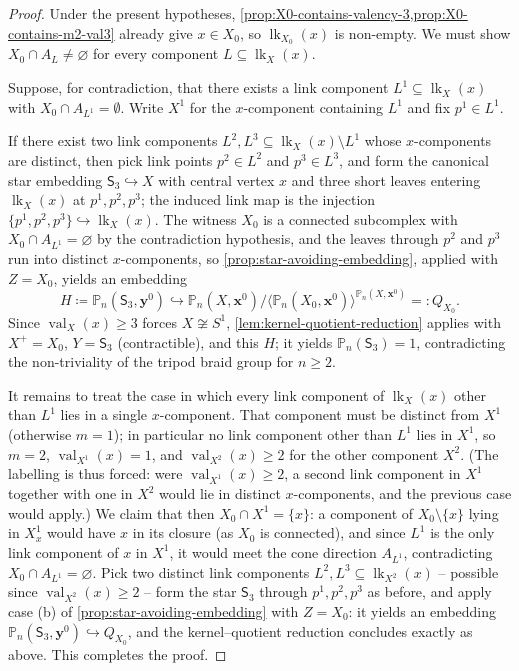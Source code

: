 \documentclass[reqno]{amsart}
\theoremstyle{definition}
\newcommand\bfx{\mathbf{x}}
\newcommand\bfy{\mathbf{y}}
\newcommand\sfS{\mathsf{S}}
\newcommand{\PB}{\mathbb{P}}
\newcommand{\co}[1]{\mathopen{\langle}#1\mathclose{\rangle}} %
\newcommand{\base}{\bfx^0}
\DeclareMathOperator{\lk}{lk}
\DeclareMathOperator{\val}{val}
\numberwithin{equation}{section}
\begin{document}
\begin{proof}
Under the present hypotheses,
\cref{prop:X0-contains-valency-3,prop:X0-contains-m2-val3} already give \(x\in X_0\), so
\(\lk_{X_0}(x)\) is non-empty. We must show \(X_0\cap A_L\neq\varnothing\)
for every component \(L\subseteq\lk_X(x)\).

Suppose, for contradiction, that there exists a link component
\(L^1\subseteq\lk_X(x)\) with \(X_0\cap A_{L^1}=\emptyset\). Write
\(X^1\) for the \(x\)-component containing \(L^1\) and fix
\(p^1\in L^1\). 

If there exist two link components
\(L^2,L^3\subseteq\lk_X(x)\setminus L^1\) whose \(x\)-components
are distinct, then
pick link points \(p^2\in L^2\)
and \(p^3\in L^3\), and form the canonical star embedding
\(\sfS_3\hookrightarrow X\) with central vertex \(x\) and three
short leaves entering \(\lk_X(x)\) at \(p^1,p^2,p^3\); the induced
link map is the injection
\(\{p^1,p^2,p^3\}\hookrightarrow\lk_X(x)\). The witness \(X_0\) is
a connected subcomplex with \(X_0\cap A_{L^1}=\varnothing\) by the
contradiction hypothesis, and the leaves through \(p^2\) and
\(p^3\) run into distinct \(x\)-components, so
\cref{prop:star-avoiding-embedding}, applied with \(Z=X_0\),
yields an embedding
\[
H\coloneqq\PB_n(\sfS_3,\bfy^0)\hookrightarrow
\PB_n(X,\base)\big/\co{\PB_n(X_0,\base)}^{\PB_n(X,\base)}
=: Q_{X_0}.
\]
Since \(\val_X(x)\geq 3\) forces \(X\not\cong S^1\),
\cref{lem:kernel-quotient-reduction} applies with \(X^+=X_0\),
\(Y=\sfS_3\) (contractible), and this \(H\); it yields
\(\PB_n(\sfS_3)=1\), contradicting the non-triviality of the
tripod braid group for \(n\geq 2\).

It remains to treat the case in which every link component of
\(\lk_X(x)\) other than \(L^1\) lies in a single
\(x\)-component. That component must be distinct from \(X^1\)
(otherwise \(m=1\)); in particular no link component other than
\(L^1\) lies in \(X^1\), so \(m=2\), \(\val_{X^1}(x)=1\), and
\(\val_{X^2}(x)\geq 2\) for the other component \(X^2\). (The
labelling is thus forced: were \(\val_{X^1}(x)\geq2\), a second
link component in \(X^1\) together with one in \(X^2\) would
lie in distinct \(x\)-components, and the previous case would
apply.) We claim
that then \(X_0\cap X^1=\{x\}\): a component of
\(X_0\setminus\{x\}\) lying in \(X^1_x\) would have \(x\) in its
closure (as \(X_0\) is connected), and since \(L^1\) is the only
link component of \(x\) in \(X^1\), it would meet the cone
direction \(A_{L^1}\), contradicting
\(X_0\cap A_{L^1}=\varnothing\). Pick two distinct link components
\(L^2,L^3\subseteq\lk_{X^2}(x)\) -- possible since
\(\val_{X^2}(x)\geq2\) -- form the star \(\sfS_3\) through
\(p^1,p^2,p^3\) as before, and apply case (b) of
\cref{prop:star-avoiding-embedding} with \(Z=X_0\): it yields an
embedding \(\PB_n(\sfS_3,\bfy^0)\hookrightarrow Q_{X_0}\), and the
kernel--quotient reduction concludes exactly as above. This
completes the proof.
\end{proof}
\end{document}
